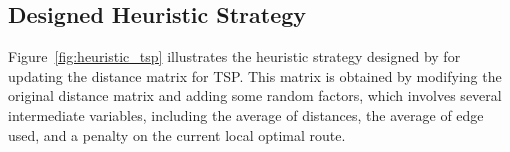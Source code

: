 
\subsection{Designed Heuristic Strategy}

Figure~\ref{fig:heuristic_tsp} illustrates the heuristic strategy designed by \ourmethod{} for updating the distance matrix for TSP. This matrix is obtained by modifying the original distance matrix and adding some random factors, which involves several intermediate variables, including the average of distances, the average of edge used, and a penalty on the current local optimal route.

